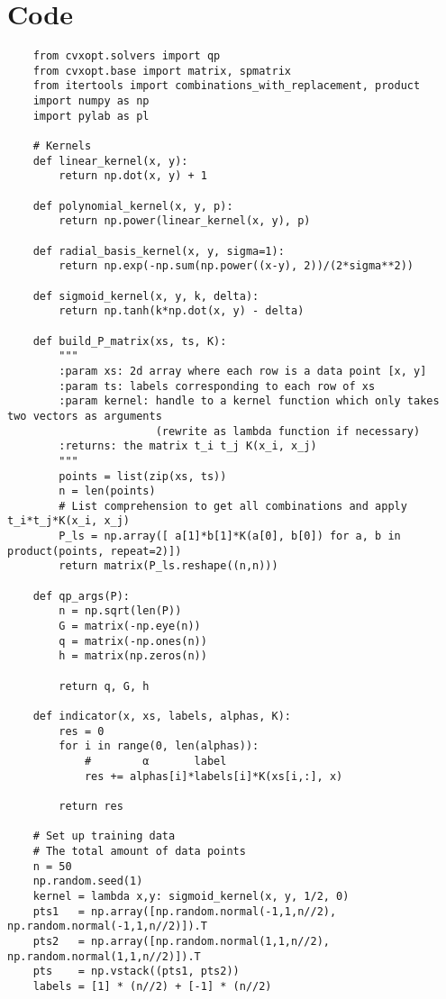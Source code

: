 \documentclass{article}
\begin{document}
\section{Code}

    \begin{verbatim}
    from cvxopt.solvers import qp
    from cvxopt.base import matrix, spmatrix
    from itertools import combinations_with_replacement, product
    import numpy as np
    import pylab as pl

    # Kernels
    def linear_kernel(x, y):
        return np.dot(x, y) + 1

    def polynomial_kernel(x, y, p):
        return np.power(linear_kernel(x, y), p)

    def radial_basis_kernel(x, y, sigma=1):
        return np.exp(-np.sum(np.power((x-y), 2))/(2*sigma**2))

    def sigmoid_kernel(x, y, k, delta):
        return np.tanh(k*np.dot(x, y) - delta)

    def build_P_matrix(xs, ts, K):
        """
        :param xs: 2d array where each row is a data point [x, y]
        :param ts: labels corresponding to each row of xs
        :param kernel: handle to a kernel function which only takes two vectors as arguments
                       (rewrite as lambda function if necessary)
        :returns: the matrix t_i t_j K(x_i, x_j)
        """
        points = list(zip(xs, ts))
        n = len(points)
        # List comprehension to get all combinations and apply t_i*t_j*K(x_i, x_j)
        P_ls = np.array([ a[1]*b[1]*K(a[0], b[0]) for a, b in product(points, repeat=2)])
        return matrix(P_ls.reshape((n,n)))

    def qp_args(P):
        n = np.sqrt(len(P))
        G = matrix(-np.eye(n))
        q = matrix(-np.ones(n))
        h = matrix(np.zeros(n))

        return q, G, h

    def indicator(x, xs, labels, alphas, K):
        res = 0
        for i in range(0, len(alphas)):
            #        α       label
            res += alphas[i]*labels[i]*K(xs[i,:], x)

        return res

    # Set up training data
    # The total amount of data points
    n = 50
    np.random.seed(1)
    kernel = lambda x,y: sigmoid_kernel(x, y, 1/2, 0)
    pts1   = np.array([np.random.normal(-1,1,n//2), np.random.normal(-1,1,n//2)]).T
    pts2   = np.array([np.random.normal(1,1,n//2), np.random.normal(1,1,n//2)]).T
    pts    = np.vstack((pts1, pts2))
    labels = [1] * (n//2) + [-1] * (n//2)


\end{verbatim}
\end{document}
